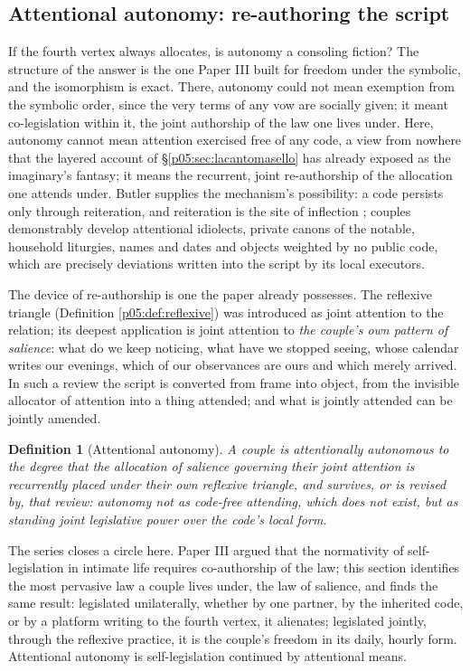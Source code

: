 \documentclass[11pt,a4paper]{article}
\theoremstyle{seriesthm}
\newtheorem{defn}{Definition}
\begin{document}
\subsection{Attentional autonomy: re-authoring the script}
\label{p05:sec:autonomy}

If the fourth vertex always allocates, is autonomy a consoling fiction? The structure of the answer is the one Paper III built for freedom under the symbolic, and the isomorphism is exact. There, autonomy could not mean exemption from the symbolic order, since the very terms of any vow are socially given; it meant co-legislation within it, the joint authorship of the law one lives under. Here, autonomy cannot mean attention exercised free of any code, a view from nowhere that the layered account of §\ref{p05:sec:lacantomasello} has already exposed as the imaginary's fantasy; it means the recurrent, joint re-authorship of the allocation one attends under. Butler supplies the mechanism's possibility: a code persists only through reiteration, and reiteration is the site of inflection \parencite{butler1997}; couples demonstrably develop attentional idiolects, private canons of the notable, household liturgies, names and dates and objects weighted by no public code, which are precisely deviations written into the script by its local executors.

The device of re-authorship is one the paper already possesses. The reflexive triangle (Definition \ref{p05:def:reflexive}) was introduced as joint attention to the relation; its deepest application is joint attention to \emph{the couple's own pattern of salience}: what do we keep noticing, what have we stopped seeing, whose calendar writes our evenings, which of our observances are ours and which merely arrived. In such a review the script is converted from frame into object, from the invisible allocator of attention into a thing attended; and what is jointly attended can be jointly amended.

\begin{defn}[Attentional autonomy]\label{p05:def:autonomy}
A couple is attentionally autonomous to the degree that the allocation of salience governing their joint attention is recurrently placed under their own reflexive triangle, and survives, or is revised by, that review: autonomy not as code-free attending, which does not exist, but as standing joint legislative power over the code's local form.
\end{defn}

The series closes a circle here. Paper III argued that the normativity of self-legislation in intimate life requires co-authorship of the law; this section identifies the most pervasive law a couple lives under, the law of salience, and finds the same result: legislated unilaterally, whether by one partner, by the inherited code, or by a platform writing to the fourth vertex, it alienates; legislated jointly, through the reflexive practice, it is the couple's freedom in its daily, hourly form. Attentional autonomy is self-legislation continued by attentional means.
\end{document}
